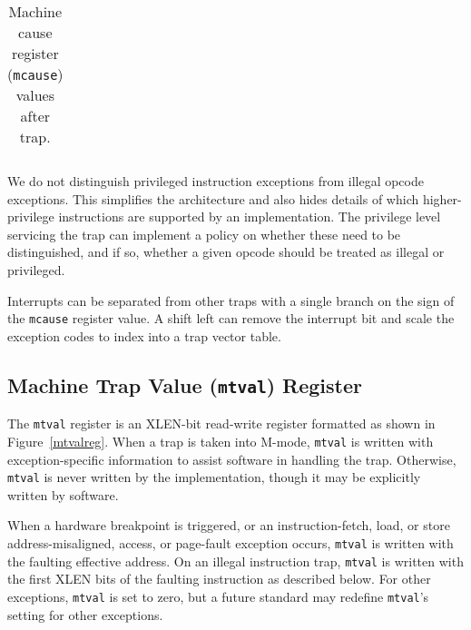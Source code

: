 \begin{table*}[h!]
\begin{center}
\begin{tabular}{|r|r|l|l|}
\end{tabular}
\end{center}
\caption{Machine cause register ({\tt mcause}) values after trap.}
\label{mcauses}
\end{table*}

\begin{commentary}
We do not distinguish privileged instruction exceptions from illegal
opcode exceptions.  This simplifies the architecture and also hides
details of which higher-privilege instructions are supported by an
implementation.  The privilege level servicing the trap can implement
a policy on whether these need to be distinguished, and if so, whether
a given opcode should be treated as illegal or privileged.
\end{commentary}

\begin{commentary}
Interrupts can be separated from other traps with a single branch on the sign of
the {\tt mcause} register value.  A shift left can remove the
interrupt bit and scale the exception codes to index into a trap
vector table.
\end{commentary}

\subsection{Machine Trap Value ({\tt mtval}) Register}

The {\tt mtval} register is an XLEN-bit read-write register formatted as shown
in Figure~\ref{mtvalreg}.  When a trap is taken into M-mode, {\tt mtval} is
written with exception-specific information to assist software in handling the
trap.  Otherwise, {\tt mtval} is never written by the implementation, though
it may be explicitly written by software.

When a hardware
breakpoint is triggered, or an instruction-fetch, load, or store
address-misaligned, access, or page-fault exception occurs, {\tt mtval} is
written with the faulting effective address.  On an illegal instruction trap,
{\tt mtval} is written with the first XLEN bits of the faulting
instruction as described below.  For other exceptions, {\tt mtval} is
set to zero, but a future standard may redefine {\tt mtval}'s setting for
other exceptions.

